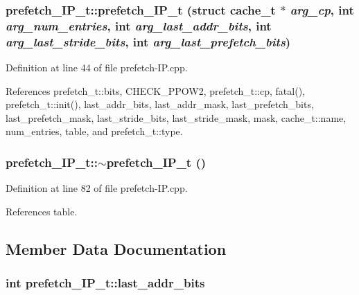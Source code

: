 \subsubsection[{prefetch\_\-IP\_\-t}]{\setlength{\rightskip}{0pt plus 5cm}prefetch\_\-IP\_\-t::prefetch\_\-IP\_\-t (struct {\bf cache\_\-t} $\ast$ {\em arg\_\-cp}, \/  int {\em arg\_\-num\_\-entries}, \/  int {\em arg\_\-last\_\-addr\_\-bits}, \/  int {\em arg\_\-last\_\-stride\_\-bits}, \/  int {\em arg\_\-last\_\-prefetch\_\-bits})\hspace{0.3cm}{\tt  [inline]}}\label{classprefetch__IP__t_59e691556a1cfbd745161b0fe7974273}




Definition at line 44 of file prefetch-IP.cpp.

References prefetch\_\-t::bits, CHECK\_\-PPOW2, prefetch\_\-t::cp, fatal(), prefetch\_\-t::init(), last\_\-addr\_\-bits, last\_\-addr\_\-mask, last\_\-prefetch\_\-bits, last\_\-prefetch\_\-mask, last\_\-stride\_\-bits, last\_\-stride\_\-mask, mask, cache\_\-t::name, num\_\-entries, table, and prefetch\_\-t::type.
\subsubsection[{$\sim$prefetch\_\-IP\_\-t}]{\setlength{\rightskip}{0pt plus 5cm}prefetch\_\-IP\_\-t::$\sim$prefetch\_\-IP\_\-t ()\hspace{0.3cm}{\tt  [inline]}}\label{classprefetch__IP__t_7a39286a9b40ef18a2c295e6e66cbebd}




Definition at line 82 of file prefetch-IP.cpp.

References table.

\subsection{Member Data Documentation}
\subsubsection[{last\_\-addr\_\-bits}]{\setlength{\rightskip}{0pt plus 5cm}int {\bf prefetch\_\-IP\_\-t::last\_\-addr\_\-bits}\hspace{0.3cm}{\tt  [protected]}}\label{classprefetch__IP__t_3323711ae2598e9c3cf9c42f99b85867}





